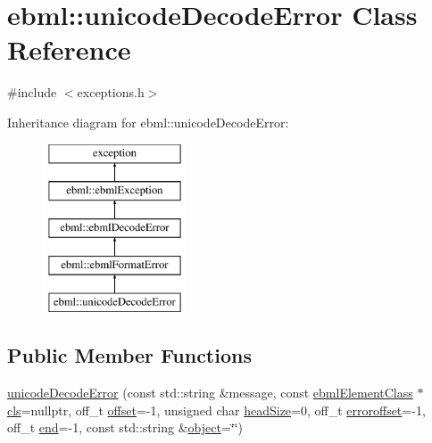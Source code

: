 \hypertarget{classebml_1_1unicodeDecodeError}{}\section{ebml\+:\+:unicode\+Decode\+Error Class Reference}
\label{classebml_1_1unicodeDecodeError}


{\ttfamily \#include $<$exceptions.\+h$>$}

Inheritance diagram for ebml\+:\+:unicode\+Decode\+Error\+:\begin{figure}[H]
\begin{center}
\leavevmode
\includegraphics[height=5.000000cm]{classebml_1_1unicodeDecodeError}
\end{center}
\end{figure}
\subsection*{Public Member Functions}
\begin{DoxyCompactItemize}
\item 
\mbox{\hyperlink{classebml_1_1unicodeDecodeError_a585952785a9a0aaeb39e65e81bbabe20}{unicode\+Decode\+Error}} (const std\+::string \&message, const \mbox{\hyperlink{classebml_1_1ebmlElementClass}{ebml\+Element\+Class}} $\ast$\mbox{\hyperlink{classebml_1_1ebmlDecodeError_a3568b4ea3cd5bd16b9510abfe269920f}{cls}}=nullptr, off\+\_\+t \mbox{\hyperlink{classebml_1_1ebmlDecodeError_ad32ac9b3dd52f1c11479085d9c665e0f}{offset}}=-\/1, unsigned char \mbox{\hyperlink{classebml_1_1ebmlDecodeError_a61a4d4856f0c779a1c216e45dc5a7c1e}{head\+Size}}=0, off\+\_\+t \mbox{\hyperlink{classebml_1_1ebmlDecodeError_acb525117e0109d9640fb5e8c546e9a02}{erroroffset}}=-\/1, off\+\_\+t \mbox{\hyperlink{classebml_1_1unicodeDecodeError_aa04987ff9110293b4a5f847303559371}{end}}=-\/1, const std\+::string \&\mbox{\hyperlink{classebml_1_1unicodeDecodeError_a7a5d70226de247efb69088d0169c3dff}{object}}=\char`\"{}\char`\"{})
\end{DoxyCompactItemize}
